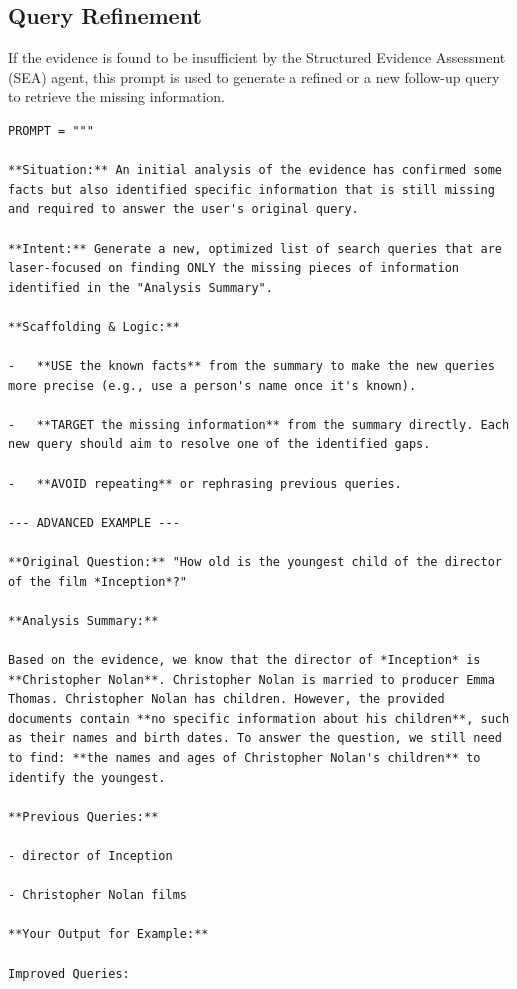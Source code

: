 \documentclass[11pt]{article}
\begin{document}
\subsection{Query Refinement}

If the evidence is found to be insufficient by the Structured Evidence Assessment (SEA) agent, this prompt is used to generate a refined or a new follow-up query to retrieve the missing information.

\begin{lstlisting}[basicstyle=\scriptsize\ttfamily]
PROMPT = """

**Situation:** An initial analysis of the evidence has confirmed some facts but also identified specific information that is still missing and required to answer the user's original query.

**Intent:** Generate a new, optimized list of search queries that are laser-focused on finding ONLY the missing pieces of information identified in the "Analysis Summary".

**Scaffolding & Logic:**

-   **USE the known facts** from the summary to make the new queries more precise (e.g., use a person's name once it's known).

-   **TARGET the missing information** from the summary directly. Each new query should aim to resolve one of the identified gaps.

-   **AVOID repeating** or rephrasing previous queries.

--- ADVANCED EXAMPLE ---

**Original Question:** "How old is the youngest child of the director of the film *Inception*?"

**Analysis Summary:**

Based on the evidence, we know that the director of *Inception* is **Christopher Nolan**. Christopher Nolan is married to producer Emma Thomas. Christopher Nolan has children. However, the provided documents contain **no specific information about his children**, such as their names and birth dates. To answer the question, we still need to find: **the names and ages of Christopher Nolan's children** to identify the youngest.

**Previous Queries:**

- director of Inception

- Christopher Nolan films

**Your Output for Example:**

Improved Queries:


\end{lstlisting}
\end{document}
